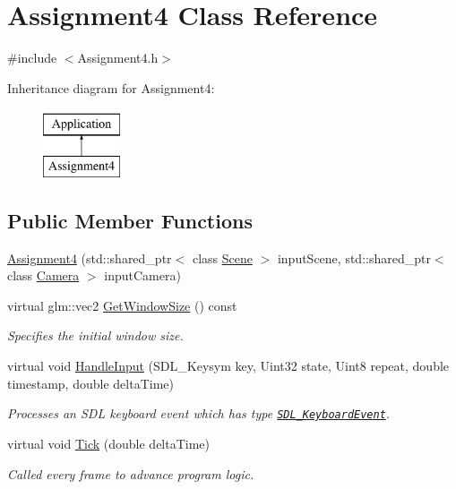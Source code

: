 \hypertarget{class_assignment4}{}\section{Assignment4 Class Reference}
\label{class_assignment4}


{\ttfamily \#include $<$Assignment4.\+h$>$}

Inheritance diagram for Assignment4\+:\begin{figure}[H]
\begin{center}
\leavevmode
\includegraphics[height=2.000000cm]{class_assignment4}
\end{center}
\end{figure}
\subsection*{Public Member Functions}
\begin{DoxyCompactItemize}
\item 
\hyperlink{class_assignment4_a318b02cf93165113069f3b44a8d13589}{Assignment4} (std\+::shared\+\_\+ptr$<$ class \hyperlink{class_scene}{Scene} $>$ input\+Scene, std\+::shared\+\_\+ptr$<$ class \hyperlink{class_camera}{Camera} $>$ input\+Camera)
\item 
virtual glm\+::vec2 \hyperlink{class_assignment4_ad197b75e730f9b32458429df8d55458e}{Get\+Window\+Size} () const
\begin{DoxyCompactList}\small\item\em Specifies the initial window size. \end{DoxyCompactList}\item 
virtual void \hyperlink{class_assignment4_a02c51d46e2cbb55e7963b6bfbedaf1c4}{Handle\+Input} (S\+D\+L\+\_\+\+Keysym key, Uint32 state, Uint8 repeat, double timestamp, double delta\+Time)
\begin{DoxyCompactList}\small\item\em Processes an S\+DL keyboard event which has type \href{https://wiki.libsdl.org/SDL_KeyboardEvent}{\tt S\+D\+L\+\_\+\+Keyboard\+Event}. \end{DoxyCompactList}\item 
virtual void \hyperlink{class_assignment4_a3ef3fef7a6ae13603bc453b29e079c5d}{Tick} (double delta\+Time)
\begin{DoxyCompactList}\small\item\em Called every frame to advance program logic. \end{DoxyCompactList}\end{DoxyCompactItemize}
